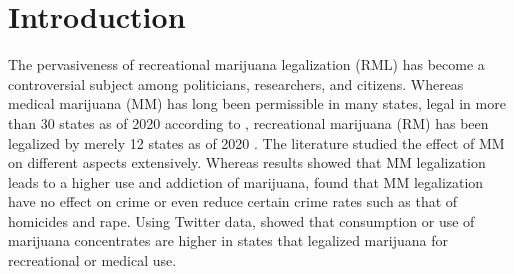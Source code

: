 \documentclass[12pt]{article}%
\begin{document}
\section{Introduction}

The pervasiveness of recreational marijuana legalization (RML) has become a controversial subject among politicians, researchers, and citizens. 
Whereas medical marijuana (MM) has long been permissible in many states, legal in more than 30 states as of 2020 according to \cite{kinaSUR}, recreational marijuana (RM) has been legalized by merely 12 states as of 2020 \citep{kinaSUR}. The literature studied the effect of MM on different aspects extensively. Whereas\cite{wen2015effect,cerda2012medical,martins2016state} results showed that MM legalization leads to a higher use and addiction of marijuana, \cite{morris2014effect, gavrilova2019legal}  found that MM legalization have no effect on crime or even reduce certain crime rates such as that of  homicides and rape. Using Twitter data, \cite{kinaSUR} showed that consumption or use of marijuana concentrates are higher in states that legalized marijuana for recreational or medical use.  
\end{document}
